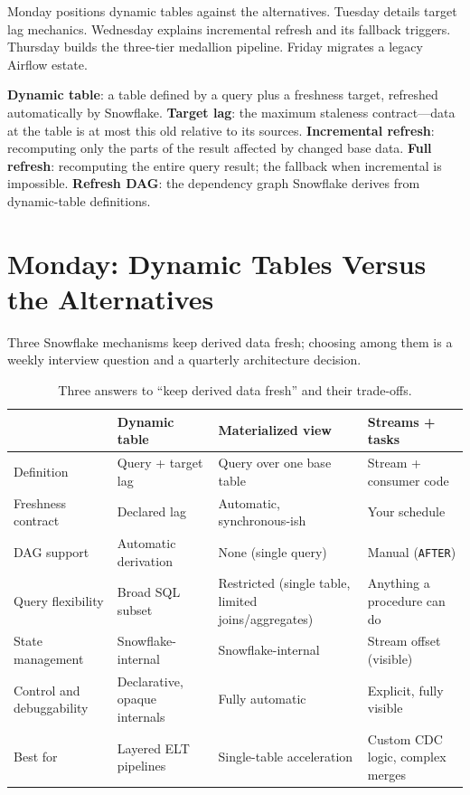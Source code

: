 Monday positions dynamic tables against the alternatives. Tuesday details target lag mechanics. Wednesday explains incremental refresh and its fallback triggers. Thursday builds the three-tier medallion pipeline. Friday migrates a legacy Airflow estate.

\begin{keyterms}
\textbf{Dynamic table}: a table defined by a query plus a freshness target, refreshed automatically by Snowflake.\quad
\textbf{Target lag}: the maximum staleness contract---data at the table is at most this old relative to its sources.\quad
\textbf{Incremental refresh}: recomputing only the parts of the result affected by changed base data.\quad
\textbf{Full refresh}: recomputing the entire query result; the fallback when incremental is impossible.\quad
\textbf{Refresh DAG}: the dependency graph Snowflake derives from dynamic-table definitions.
\end{keyterms}

\section{Monday: Dynamic Tables Versus the Alternatives}
Three Snowflake mechanisms keep derived data fresh; choosing among them is a weekly interview question and a quarterly architecture decision.

\begin{table}[H]
\centering
\small
\begin{tabular}{@{}p{3.2cm}p{3.4cm}p{3.4cm}p{3.4cm}@{}}
\toprule
 & \textbf{Dynamic table} & \textbf{Materialized view} & \textbf{Streams + tasks} \\
\midrule
Definition & Query + target lag & Query over one base table & Stream + consumer code \\
Freshness contract & Declared lag & Automatic, synchronous-ish & Your schedule \\
DAG support & Automatic derivation & None (single query) & Manual (\texttt{AFTER}) \\
Query flexibility & Broad SQL subset & Restricted (single table, limited joins/aggregates) & Anything a procedure can do \\
State management & Snowflake-internal & Snowflake-internal & Stream offset (visible) \\
Control and debuggability & Declarative, opaque internals & Fully automatic & Explicit, fully visible \\
Best for & Layered ELT pipelines & Single-table acceleration & Custom CDC logic, complex merges \\
\bottomrule
\end{tabular}
\caption{Three answers to ``keep derived data fresh'' and their trade-offs.}
\label{tab:chapter11-mechanism-comparison}
\end{table}

